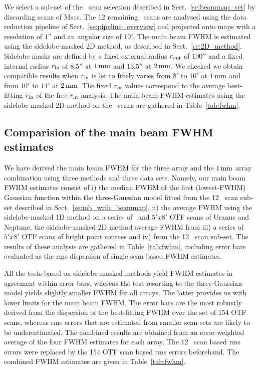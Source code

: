 We select a sub-set of the \bm\ scan selection described in
Sect.~\ref{se:beammap_set} by discarding scans of Mars.
The 12 remaining \bm\ scans are analysed using the data reduction
pipeline of Sect.~\ref{se:pipeline_overview} and projected onto maps
with a resolution of $1''$ and an angular size of $10'$.    
The main beam FWHM is estimated using the sidelobe-masked 2D method, as
described in Sect.~\ref{se:2D_method}. Sidelobe masks are
defined by a fixed external radius $r_{\rm{out}}$ of $100''$ and a
fixed internal radius $r_{\rm{in}}$ of $8.5''$ at $1\,\rm{mm}$ and
$13.5''$ at $2\,\rm{mm}$. We checked we obtain compatible results when
$r_{\rm{in}}$ is let to freely varies from $8'$ to $10'$ at
$1\,\rm{mm}$ and from $10'$ to $14'$ at $2\,\rm{mm}$. The fixed
$r_{\rm{in}}$ values correspond to the average best-fitting
$r_{\rm{in}}$ of the free-$r_{\rm{in}}$ analysis. The main beam FWHM
estimates using the sidelobe-masked 2D method on the \bm\ scans are
gathered in Table~\ref{tab:fwhm}.


\subsection{Comparision of the main beam FWHM estimates}

We have derived the main beam FWHM for the three array and the
$1\,\rm{mm}$ array combination using three methods and three data
sets. Namely, our main beam FWHM estimates
consist of i) the median FWHM of the first (lowest-FWHM) Gaussian
function within the three-Gaussian model fitted from the 12 \bm\ scan
sub-set described in
Sect.~\ref{se:mb_with_beammap}, ii) the average FWHM using the
sidelobe-masked 1D method on a series of \bm\ and $5'x8'$ OTF scans of
Uranus and Neptune, the sidelobe-masked 2D method average FWHM
from iii) a series of $5'x8'$ OTF scans of bright point sources and
iv) from the 12 \bm\ scan sub-set. The results of these analysis are
gathered in Table~\ref{tab:fwhm}, including error bars evaluated as
the rms dispersion of single-scan based FWHM estimates.

All the tests based on sidelobe-masked methods yield FWHM estimates
in agreement within error bars, whereas the test resorting to the
three-Gaussian model yields slightly smaller FWHM for all arrays. The
latter provides us with lower limits for the main beam FWHM. The error
bars are the most robustly derived from the dispersion of the
best-fitting FWHM over the set of 154 OTF scans, whereas rms errors
that are estimated from smaller scan sets are likely to be
underestimated. The combined results are obtained from an error-weighted
average of the four FWHM estimates for each array. The 12 \bm\ scan
based rms errors were replaced by the 154 OTF scan based rms errors
beforehand.
The combined FWHM estimates are given in Table~\ref{tab:fwhm}.


